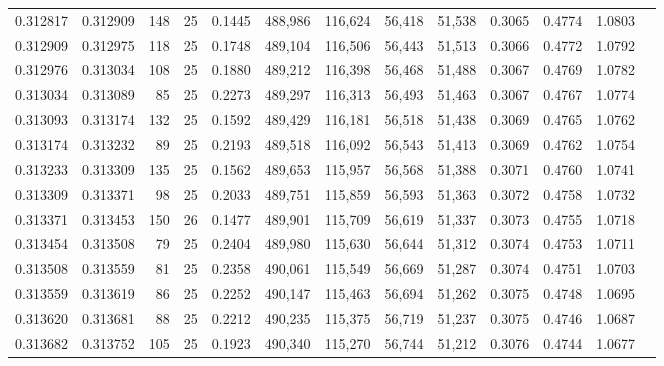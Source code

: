 \begin{tabular}{rrrrrrrrrrrrr}
0.312817 & 0.312909 &   148 &  25 &                                     0.1445 & 488,986 & 116,624 &  56,418 &  51,538 & 0.3065 & 0.4774 & 1.0803 \\
0.312909 & 0.312975 &   118 &  25 &                                     0.1748 & 489,104 & 116,506 &  56,443 &  51,513 & 0.3066 & 0.4772 & 1.0792 \\
0.312976 & 0.313034 &   108 &  25 &                                     0.1880 & 489,212 & 116,398 &  56,468 &  51,488 & 0.3067 & 0.4769 & 1.0782 \\
0.313034 & 0.313089 &    85 &  25 &                                     0.2273 & 489,297 & 116,313 &  56,493 &  51,463 & 0.3067 & 0.4767 & 1.0774 \\
0.313093 & 0.313174 &   132 &  25 &                                     0.1592 & 489,429 & 116,181 &  56,518 &  51,438 & 0.3069 & 0.4765 & 1.0762 \\
0.313174 & 0.313232 &    89 &  25 &                                     0.2193 & 489,518 & 116,092 &  56,543 &  51,413 & 0.3069 & 0.4762 & 1.0754 \\
0.313233 & 0.313309 &   135 &  25 &                                     0.1562 & 489,653 & 115,957 &  56,568 &  51,388 & 0.3071 & 0.4760 & 1.0741 \\
0.313309 & 0.313371 &    98 &  25 &                                     0.2033 & 489,751 & 115,859 &  56,593 &  51,363 & 0.3072 & 0.4758 & 1.0732 \\
0.313371 & 0.313453 &   150 &  26 &                                     0.1477 & 489,901 & 115,709 &  56,619 &  51,337 & 0.3073 & 0.4755 & 1.0718 \\
0.313454 & 0.313508 &    79 &  25 &                                     0.2404 & 489,980 & 115,630 &  56,644 &  51,312 & 0.3074 & 0.4753 & 1.0711 \\
0.313508 & 0.313559 &    81 &  25 &                                     0.2358 & 490,061 & 115,549 &  56,669 &  51,287 & 0.3074 & 0.4751 & 1.0703 \\
0.313559 & 0.313619 &    86 &  25 &                                     0.2252 & 490,147 & 115,463 &  56,694 &  51,262 & 0.3075 & 0.4748 & 1.0695 \\
0.313620 & 0.313681 &    88 &  25 &                                     0.2212 & 490,235 & 115,375 &  56,719 &  51,237 & 0.3075 & 0.4746 & 1.0687 \\
0.313682 & 0.313752 &   105 &  25 &                                     0.1923 & 490,340 & 115,270 &  56,744 &  51,212 & 0.3076 & 0.4744 & 1.0677 \\

\end{tabular}
